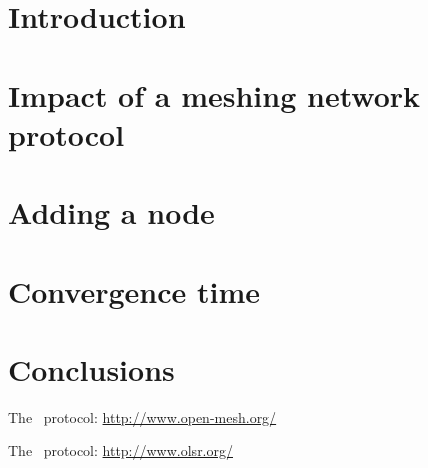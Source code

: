 \documentclass{article}
\begin{document}
\thispagestyle{empty}
\tableofcontents

\clearpage
\setcounter{page}{1}

\section{Introduction} \label{sec:Intro}
\vspace{-3mm}\HRule

    

\section{Impact of a meshing network protocol} \label{sec:Impact}
\vspace{-3mm}\HRule

    

\section{Adding a node} \label{sec:AddNode}
\vspace{-3mm}\HRule

%    

\section{Convergence time} \label{sec:Convergence}
\vspace{-3mm}\HRule

%    

\clearpage
\section{Conclusions} \label{sec:Conclusions}
\vspace{-3mm}\HRule

%    



\begin{thebibliography}{99}

     The \batman\ protocol:
    \url{http://www.open-mesh.org/}

     The \olsr\ protocol:
    \url{http://www.olsr.org/}

%
%

\end{thebibliography}
\end{document}
